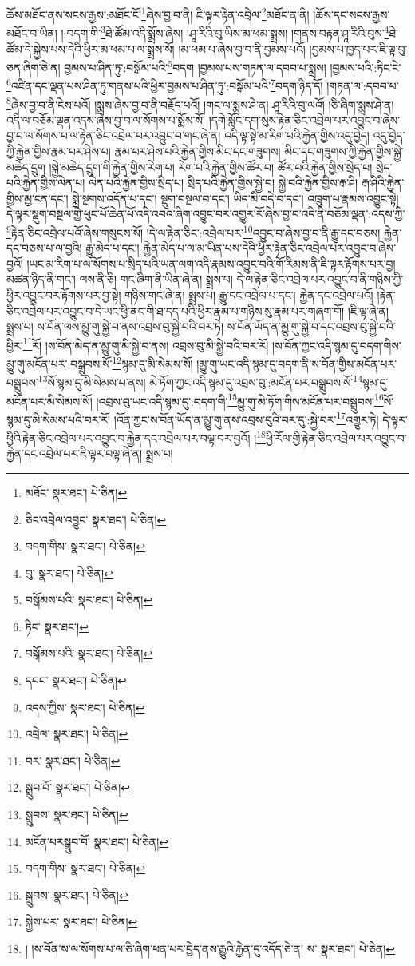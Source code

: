 ཆོས་མཐོང་ནས་སངས་རྒྱས་:མཐོང་ངོ་\footnote{མཐོང་  སྣར་ཐང་།  པེ་ཅིན། }ཞེས་བྱ་བ་ནི། ཇི་ལྟར་རྟེན་འབྲེལ་\footnote{ཅིང་འབྲེལ་འབྱུང་  སྣར་ཐང་།  པེ་ཅིན། }མཐོང་ན་ནི། །ཆོས་དང་སངས་རྒྱས་མཐོང་བ་ཡིན། །:བདག་གི་\footnote{བདག་གིས་  སྣར་ཐང་།  པེ་ཅིན། }ཐེ་ཚོམ་འདི་སྨྲོས་ཞེས། །ཤཱ་རིའི་བུ་ཡིས་མ་ཕམ་སྨྲས། །གནས་བརྟན་ཤཱ་རིའི་བུས་\footnote{བུ་  སྣར་ཐང་།  པེ་ཅིན། }ཐེ་ཚོམ་དེ་སྐྱེས་པས་དེའི་ཕྱིར་མ་ཕམ་པ་ལ་སྨྲས་སོ། །མ་ཕམ་པ་ཞེས་བྱ་བ་ནི་བྱམས་པའོ། །བྱམས་པ་ཁྱད་པར་ཇི་ལྟ་བུ་ཅན་ཞིག་ཅེ་ན། བྱམས་པ་ཤིན་ཏུ་:བསྒོམ་པའི་\footnote{བསྒོམས་པའི་  སྣར་ཐང་།  པེ་ཅིན། }བདག །བྱམས་པས་གཏན་ལ་དབབ་པ་སྨྲས། །བྱམས་པའི་:ཏིང་ངེ་\footnote{ཏིང་  སྣར་ཐང་། }འཛིན་དང་ལྡན་པས་ཤིན་ཏུ་གནས་པའི་ཕྱིར་བྱམས་པ་ཤིན་ཏུ་:བསྒོམ་པའི་\footnote{བསྒོམས་པའི་  སྣར་ཐང་།  པེ་ཅིན། }བདག་ཉིད་དོ། །གཏན་ལ་:དབབ་པ་\footnote{དབབ་  སྣར་ཐང་།  པེ་ཅིན། }ཞེས་བྱ་བ་ནི་ངེས་པའོ། །སྨྲས་ཞེས་བྱ་བ་ནི་བརྗོད་པའོ། །གང་ལ་སྨྲས་ཤེ་ན། ཤཱ་རིའི་བུ་ལའོ། །ཅི་ཞིག་སྨྲས་ཤེ་ན། འདི་ལ་བཅོམ་ལྡན་འདས་ཞེས་བྱ་བ་ལ་སོགས་པ་སྨོས་སོ། །དགེ་སློང་དག་སུས་རྟེན་ཅིང་འབྲེལ་པར་འབྱུང་བ་ཞེས་བྱ་བ་ལ་སོགས་པ་ལ་རྟེན་ཅིང་འབྲེལ་པར་འབྱུང་བ་གང་ཞེ་ན། འདི་ལྟ་སྟེ་མ་རིག་པའི་རྐྱེན་གྱིས་འདུ་བྱེད། འདུ་བྱེད་ཀྱི་རྐྱེན་གྱིས་རྣམ་པར་ཤེས་པ། རྣམ་པར་ཤེས་པའི་རྐྱེན་གྱིས་མིང་དང་གཟུགས། མིང་དང་གཟུགས་ཀྱི་རྐྱེན་གྱིས་སྐྱེ་མཆེད་དྲུག །སྐྱེ་མཆེད་དྲུག་གི་རྐྱེན་གྱིས་རེག་པ། རེག་པའི་རྐྱེན་གྱིས་ཚོར་བ། ཚོར་བའི་རྐྱེན་གྱིས་སྲེད་པ། སྲེད་པའི་རྐྱེན་གྱིས་ལེན་པ། ལེན་པའི་རྐྱེན་གྱིས་སྲིད་པ། སྲིད་པའི་རྐྱེན་གྱིས་སྐྱེ་བ། སྐྱེ་བའི་རྐྱེན་གྱིས་རྒ་ཤི། རྒ་ཤིའི་རྐྱེན་གྱིས་མྱ་ངན་དང་། སྨྲེ་སྔགས་འདོན་པ་དང་། སྡུག་བསྔལ་བ་དང་། ཡིད་མི་བདེ་བ་དང་། འཁྲུག་པ་རྣམས་འབྱུང་སྟེ། དེ་ལྟར་སྡུག་བསྔལ་གྱི་ཕུང་པོ་ཆེན་པོ་འདི་འབའ་ཞིག་འབྱུང་བར་འགྱུར་རོ་ཞེས་བྱ་བ་འདི་ནི་བཅོམ་ལྡན་:འདས་ཀྱི་\footnote{འདས་ཀྱིས་  སྣར་ཐང་།  པེ་ཅིན། }རྟེན་ཅིང་འབྲེལ་པའོ་ཞེས་གསུངས་སོ། །དེ་ལ་རྟེན་ཅིང་:འབྲེལ་པར་\footnote{འབྲེལ་  སྣར་ཐང་།  པེ་ཅིན། }འབྱུང་བ་ཞེས་བྱ་བ་ནི་རྒྱུ་དང་བཅས། རྐྱེན་དང་བཅས་པ་ལ་བྱའི། རྒྱུ་མེད་པ་དང་། རྐྱེན་མེད་པ་ལ་མ་ཡིན་པས་དེའི་ཕྱིར་རྟེན་ཅིང་འབྲེལ་པར་འབྱུང་བ་ཞེས་བྱའོ། །ཡང་མ་རིག་པ་ལ་སོགས་པ་སྲིད་པའི་ཡན་ལག་འདི་རྣམས་འབྱུང་བའི་གོ་རིམས་ནི་ཇི་ལྟར་རྟོགས་པར་བྱ། མཚན་ཉིད་ནི་གང་། ལས་ནི་ཅི། གང་ཞིག་ནི་ཡིན་ཞེ་ན། སྨྲས་པ། དེ་ལ་རྟེན་ཅིང་འབྲེལ་པར་འབྱུང་བ་ནི་གཉིས་ཀྱི་ཕྱིར་འབྱུང་བར་རྟོགས་པར་བྱ་སྟེ། གཉིས་གང་ཞེ་ན། སྨྲས་པ། རྒྱུ་དང་འབྲེལ་པ་དང་། རྐྱེན་དང་འབྲེལ་པའོ། །རྟེན་ཅིང་འབྲེལ་པར་འབྱུང་བ་དེ་ཡང་ཕྱི་ནང་གི་ཐ་དད་པའི་ཕྱིར་རྣམ་པ་གཉིས་སུ་རྣམ་པར་གཞག་གོ། །ཇི་ལྟ་ཞེ་ན། སྨྲས་པ། ས་བོན་ལས་མྱུ་གུ་སྐྱེ་བ་ནས་འབྲས་བུ་སྐྱེ་བའི་བར་ཏེ། ས་བོན་ཡོད་ན་མྱུ་གུ་སྐྱེ་བ་དང་འབྲས་བུ་སྐྱེ་བའི་ཕྱིར་\footnote{བར་  སྣར་ཐང་།  པེ་ཅིན། }རོ། །ས་བོན་མེད་ན་མྱུ་གུ་མི་སྐྱེ་བ་ནས། འབྲས་བུ་མི་སྐྱེ་བའི་བར་རོ། །ས་བོན་ཀྱང་འདི་སྙམ་དུ་བདག་གིས་མྱུ་གུ་མངོན་པར་:བསྒྲུབས་སོ་\footnote{སྒྲུབ་བོ་  སྣར་ཐང་།  པེ་ཅིན། }སྙམ་དུ་མི་སེམས་སོ། །མྱུ་གུ་ཡང་འདི་སྙམ་དུ་བདག་ནི་ས་བོན་གྱིས་མངོན་པར་བསྒྲུབས་\footnote{སྒྲུབས་  སྣར་ཐང་།  པེ་ཅིན། }སོ་སྙམ་དུ་མི་སེམས་པ་ནས། མེ་ཏོག་ཀྱང་འདི་སྙམ་དུ་འབྲས་བུ་:མངོན་པར་བསྒྲུབས་སོ་\footnote{མངོན་པརསྒྲུབ་བོ་  སྣར་ཐང་།  པེ་ཅིན། }སྙམ་དུ་མངོན་པར་མི་སེམས་སོ། །འབྲས་བུ་ཡང་འདི་སྙམ་དུ་:བདག་གི་\footnote{བདག་གིས་  སྣར་ཐང་།  པེ་ཅིན། }མྱུ་གུ་མེ་ཏོག་གིས་མངོན་པར་བསྒྲུབས་\footnote{སྒྲུབས་  སྣར་ཐང་།  པེ་ཅིན། }སོ་སྙམ་དུ་མི་སེམས་པའི་བར་རོ། །འོན་ཀྱང་ས་བོན་ཡོད་ན་མྱུ་གུ་ནས་འབྲས་བུའི་བར་དུ་:སྐྱེ་བར་\footnote{སྐྱེས་པར་  སྣར་ཐང་།  པེ་ཅིན། }འགྱུར་ཏེ། དེ་ལྟར་ཕྱིའི་རྟེན་ཅིང་འབྲེལ་པར་འབྱུང་བ་རྐྱེན་དང་འབྲེལ་པར་བལྟ་བར་བྱའོ། །\footnote{། །ས་བོན་ས་ལ་སོགས་པ་ལ་ཅི་ཞིག་ཕན་པར་བྱེད་ནས་རྒྱུའི་རྐྱེན་དུ་འདོད་ཅེ་ན། ས་  སྣར་ཐང་།  པེ་ཅིན། }ཕྱི་རོལ་གྱི་རྟེན་ཅིང་འབྲེལ་པར་འབྱུང་བ་རྐྱེན་དང་འབྲེལ་པར་ཇི་ལྟར་བལྟ་ཞེ་ན། སྨྲས་པ། 